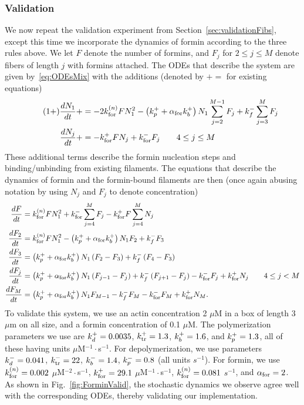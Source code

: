 \documentclass[11pt]{article}
\begin{document}
\subsubsection{Validation}
We now repeat the validation experiment from Section\ \ref{sec:validationFibs}, except this time we incorporate the dynamics of formin according to the three rules above. We let $F$ denote the number of formins, and $F_j$ for $2 \leq j \leq M$ denote fibers of length $j$ with formins attached. The ODEs that describe the system are given by\ \eqref{eq:ODEsMix} with the additions (denoted by $+=$ for existing equations)
\begin{align*}
\label{eq:1plus}
\tag{1+}
\frac{d N_1}{dt} +&= -2k_\text{for}^{(n)} FN_1^2 - \left(k_p^+ +\alpha_\text{for} k_b^+\right)N_1 \sum_{j=2}^{M-1} F_j+k_f^- \sum_{j=3}^M  F_j\\
\frac{d N_j}{dt} +& = -k_\text{for}^+ F N_j + k_\text{for}^- F_j \qquad 4 \leq j \leq M
\end{align*}
These additional terms describe the formin nucleation steps and binding/unbinding from existing filaments. The equations that describe the dynamics of formin and the formin-bound filaments are then (once again abusing notation by using $N_j$ and $F_j$ to denote concentration)
\begin{subequations}
\label{eq:ODEsFormin}
\begin{align}
\frac{d F}{dt} &=k_\text{for}^{(n)} FN_1^2+k_\text{for}^- \sum_{j=4}^{M} F_j - k_\text{for}^+ F \sum_{j=4}^M N_j \\
\frac{d F_2}{dt} &= k_\text{for}^{(n)} FN_1^2 -\left(k_p^+ +\alpha_\text{for} k_b^+\right)N_1F_2 + k_f^- F_3 \\
\frac{d F_3}{dt} &= \left(k_p^+ +\alpha_\text{for} k_b^+\right)N_1\left(F_2-F_3\right) + k_f^- \left(F_4-F_3\right) \\
\frac{d F_j}{dt} & =\left(k_p^+ +\alpha_\text{for} k_b^+\right)N_1\left(F_{j-1}-F_j\right) + k_f^- \left(F_{j+1}-F_j\right) - k_\text{for}^- F_j + k_\text{for}^+ N_j \qquad 4 \leq j < M \\
\frac{d F_M}{dt} & = \left(k_p^+ +\alpha_\text{for} k_b^+\right)N_1 F_{M-1} - k_f^- F_M - k_\text{for}^- F_M + k_\text{for}^+ N_M.
\end{align}
\end{subequations}
To validate this system, we use an actin concentration 2 $\mu$M in a box of length 3 $\mu$m on all size, and a formin concentration of 0.1 $\mu$M. The polymerization parameters we use are $k_d^+=0.0035$, $k_\text{tr}^+=1.3$, $k_b^+=1.6$, and $k_p^+=1.3$, all of these having units $\mu$M$^{-1}\cdot$s$^{-1}$. For depolymerization, we use parameters $k_d^- = 0.041$, $k_\text{tr}^- = 22$, $k_b^-=1.4$, $k_p^-=0.8$ (all units $s^{-1}$). For formin, we use $k_\text{for}^{(n)} = 0.002$ $\mu$M$^{-2}\cdot$s$^{-1}$, $k_\text{for}^+ = 29.1$ $\mu$M$^{-1}\cdot$s$^{-1}$, $k_\text{for}^{(n)} = 0.081$ $s^{-1}$, and $\alpha_\text{for}=2$. As shown in Fig.\ \ref{fig:ForminValid}, the stochastic dynamics we observe agree well with the corresponding ODEs, thereby validating our implementation.
\end{document}
